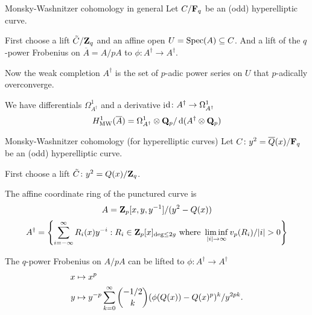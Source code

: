 \begin{frame}{Monsky-Washnitzer cohomology in general}
    Let $C /\mathbf F_q$ be an (odd) hyperelliptic curve. \pause

    First choose a lift $\tilde C/\mathbf{Z}_q$ and an affine open $U = \operatorname{Spec}(A) \subseteq C$.
    And a lift of the $q$-power Frobenius on \(\overline A= A/pA\) to \(\phi\colon A^\dagger \to A^\dagger\).

    Now the weak completion $A^\dagger$ is the set of $p$-adic power series on $U$ that $p$-adically overconverge.

    We have differentials \(\Omega_{A^\dagger}^1\) and a derivative i\(\mathop{}\!\mathrm{d} \colon A^\dagger \to \Omega^1_{A^\dagger}\)
    \[H^1_{\mathrm{MW}}(\overline A) = \Omega^1_{A^\dagger}\otimes \mathbf Q_p/\mathop{}\!\mathrm{d}(A^\dagger\otimes \mathbf Q_p)\]


\end{frame}

\begin{frame}{Monsky-Washnitzer cohomology (for hyperelliptic curves)}
    Let $C \colon y^2 = \overline Q(x)/\mathbf F_q$ be an (odd) hyperelliptic curve. \pause

    First choose a lift $\tilde C \colon y^2 = Q(x)/\mathbf{Z}_q$. \pause

    The affine coordinate ring of the punctured curve is \[A = \mathbf{Z}_p[x,y,y^{-1}]/(y^2 - Q(x))\]\pause
    \[A^\dagger =  \left\{ \sum_{i = -\infty}^\infty R_i(x)y^{-i} : R_i \in \mathbf{Z}_p[x]_{\deg \le 2g}\text{ where }\liminf_{|i| \to \infty} v_p(R_i)/|i| > 0\right\}\]\pause

    The \(q\)-power Frobenius on \(A/pA\)  can be lifted to \(\phi\colon A^\dagger \to A^\dagger\)
    \begin{align*}
        x &\mapsto x^p\\
        y &\mapsto y^{-p}\sum_{k=0}^{\infty}\binom{-1/2}{k}(\phi(Q(x)) - Q(x)^p)^k /y^{2pk}\text.
    \end{align*}
\end{frame}

